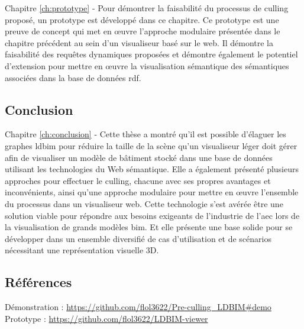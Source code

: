 \begin{refsection}
\begin{multicols}{2}
        \textsf{Chapitre \ref{ch:prototype} -}
        Pour démontrer la faisabilité du processus de culling proposé, un prototype est développé dans ce chapitre. Ce prototype est une preuve de concept qui met en œuvre l'approche modulaire présentée dans le chapitre précédent au sein d'un visualiseur basé sur le web. Il démontre la faisabilité des requêtes dynamiques proposées et démontre également le potentiel d'extension pour mettre en œuvre la visualisation sémantique des sémantiques associées dans la base de données \ac{rdf}.

        \subsection*{Conclusion}
        \textsf{Chapitre \ref{ch:conclusion} -} Cette thèse a montré qu'il est possible d'élaguer les graphes \ac{ldbim} pour réduire la taille de la scène qu'un visualiseur léger doit gérer afin de visualiser un modèle de bâtiment stocké dans une base de données utilisant les technologies du Web sémantique. Elle a également présenté plusieurs approches pour effectuer le culling, chacune avec ses propres avantages et inconvénients, ainsi qu'une approche modulaire pour mettre en œuvre l'ensemble du processus dans un visualiseur web. Cette technologie s'est avérée être une solution viable pour répondre aux besoins exigeants de l'industrie de l'\ac{aec} lors de la visualisation de grands modèles \ac{bim}. Et elle présente une base solide pour se développer dans un ensemble diversifié de cas d'utilisation et de scénarios nécessitant une représentation visuelle 3D.
    \end{multicols}
    \subsection*{Références}
    \small
    {\renewcommand*{\bibfont}{\small}
        \printbibliography}

    \textsf{Démonstration :} \url{https://github.com/flol3622/Pre-culling_LDBIM#demo}\\
    \textsf{Prototype :} \url{https://github.com/flol3622/LDBIM-viewer}
\end{refsection}
\restoregeometry